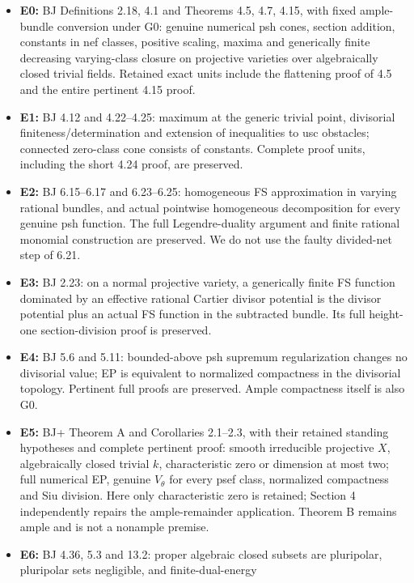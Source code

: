 \documentclass[
  10pt,
]{article}
\providecommand{\tightlist}{%
  \setlength{\itemsep}{0pt}\setlength{\parskip}{0pt}}
\begin{document}
\begin{itemize}
\tightlist
\item
  \textbf{E0:} BJ Definitions 2.18, 4.1 and Theorems 4.5, 4.7, 4.15,
  with fixed ample-bundle conversion under G0: genuine numerical psh
  cones, section addition, constants in nef classes, positive scaling,
  maxima and generically finite decreasing varying-class closure on
  projective varieties over algebraically closed trivial fields.
  Retained exact units include the flattening proof of 4.5 and the
  entire pertinent 4.15 proof.
\item
  \textbf{E1:} BJ 4.12 and 4.22--4.25: maximum at the generic trivial
  point, divisorial finiteness/determination and extension of
  inequalities to usc obstacles; connected zero-class cone consists of
  constants. Complete proof units, including the short 4.24 proof, are
  preserved.
\item
  \textbf{E2:} BJ 6.15--6.17 and 6.23--6.25: homogeneous FS
  approximation in varying rational bundles, and actual pointwise
  homogeneous decomposition for every genuine psh function. The full
  Legendre-duality argument and finite rational monomial construction
  are preserved. We do not use the faulty divided-net step of 6.21.
\item
  \textbf{E3:} BJ 2.23: on a normal projective variety, a generically
  finite FS function dominated by an effective rational Cartier divisor
  potential is the divisor potential plus an actual FS function in the
  subtracted bundle. Its full height-one section-division proof is
  preserved.
\item
  \textbf{E4:} BJ 5.6 and 5.11: bounded-above psh supremum
  regularization changes no divisorial value; EP is equivalent to
  normalized compactness in the divisorial topology. Pertinent full
  proofs are preserved. Ample compactness itself is also G0.
\item
  \textbf{E5:} BJ+ Theorem A and Corollaries 2.1--2.3, with their
  retained standing hypotheses and complete pertinent proof: smooth
  irreducible projective \(X\), algebraically closed trivial \(k\),
  characteristic zero or dimension at most two; full numerical EP,
  genuine \(V_\theta\) for every psef class, normalized compactness and
  Siu division. Here only characteristic zero is retained; Section 4
  independently repairs the ample-remainder application. Theorem B
  remains ample and is not a nonample premise.
\item
  \textbf{E6:} BJ 4.36, 5.3 and 13.2: proper algebraic closed subsets
  are pluripolar, pluripolar sets negligible, and finite-dual-energy

\end{itemize}
\end{document}
